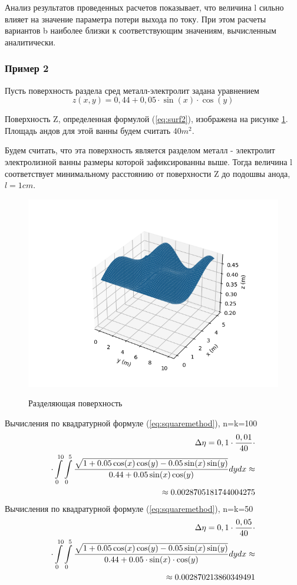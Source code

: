 \documentclass{article}
\begin{document}
Анализ результатов проведенных расчетов показывает, что величина l сильно влияет на значение параметра потери выхода по току. При этом расчеты вариантов b наиболее близки к соответствующим значениям, вычисленным аналитически. 

\subsubsection*{Пример 2}\label{ex2m}
Пусть поверхность раздела сред металл-электролит задана уравнением
\begin{equation}\label{eq:surf2}
z(x,y)=0,44+0,05 \cdot \sin(x) \cdot \cos(y)
\end{equation}

Поверхность Z, определенная формулой (\ref{eq:surf2}), изображена на рисунке \ref{fig:H2Surf}. Площадь андов для этой ванны будем считать $40 m^2$.

Будем считать, что эта поверхность является разделом металл - электролит электролизной ванны размеры которой зафиксированны выше. Тогда величина l соответствует минимальному расстоянию от поверхности Z до подошвы анода, $l=1 cm$.

\begin{figure}[H]
\centering
\includegraphics[width=0.8\linewidth]{Second_surface.png}
\caption{}
\label{fig:H2Surf}
Разделяющая поверхность
\end{figure}


Вычисления по квадратурной формуле (\ref{eq:squaremethod}), n=k=100
\begin{align}\label{eq:sq2min10}
\Delta \eta = 0,1 \cdot \frac{0,01}{40} \cdot \notag \\
\cdot \int\limits_0^{10} \int\limits_0^5 \frac{\sqrt{1+0.05 \cos(x)\cos(y)-0.05 \sin(x)\sin(y)}}{0.44 + 0.05 \sin(x)\cos(y)} dy dx \approx \notag \\ \approx 0.0028705181744004275
\end{align}
Вычисления по квадратурной формуле (\ref{eq:squaremethod}), n=k=50
\begin{align}\label{eq:sq2min5}
\Delta \eta = 0,1 \cdot \frac{0,05}{40}  \cdot \notag \\
\cdot \int\limits_0^{10} \int\limits_0^5 \frac{\sqrt{1+0.05 \cos(x)\cos(y)-0.05 \sin(x)\sin(y)}}{0.44 + 0.05 \cdot \sin(x) \cdot \cos(y)} dy dx \approx \notag \\ \approx 0.002870213860349491
\end{align}
\end{document}
